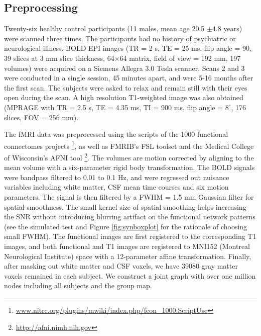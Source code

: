 \documentclass[review,authoryear]{elsarticle}
\begin{document}
\subsection{Preprocessing}
Twenty-six healthy control participants (11 males, mean age 20.5 $\pm 4.8$
years) were scanned three times. The participants had no history
of psychiatric or neurological illness. BOLD EPI images (TR = 2 s, TE = 25 ms,
flip angle = 90, 39 slices at 3 mm slice thickness, 64$\times$64 matrix, field
of view = 192 mm, 197 volumes) were acquired on a Siemens Allegra 3.0 Tesla
scanner. Scans 2 and 3 were conducted in a single session, 45
minutes apart, and were 5-16 months after the first scan. The subjects were
asked to relax and remain still with their eyes open during the scan. A high
resolution T1-weighted image was also obtained (MPRAGE with TR = 2.5 s, TE =
4.35 ms, TI = 900 ms, flip angle = $8^\circ$, 176 slices, FOV = 256 mm).

The fMRI data was preprocessed using the scripts of the 1000 functional
connectomes
projects \footnote{\url{www.nitrc.org/plugins/mwiki/index.php/fcon_1000:ScriptUse}},
as well as FMRIB's FSL toolset and the Medical College of Wisconsin's AFNI
tool \footnote{\url{http://afni.nimh.nih.gov}}. The volumes are motion corrected
by aligning to the mean volume with a six-parameter rigid body
transformation. The BOLD signals were bandpass filtered to 0.01 to 0.1 Hz, and
were regressed out nuisance variables including white matter, CSF mean time
courses and six motion parameters. The signal is then filtered by a FWHM = 1.5
mm Gaussian filter for spatial smoothness. The small kernel size of spatial
smoothing helps increasing the SNR without introducing
blurring artifact on the functional network patterns (see the simulated test and
Figure \ref{fig:synboxplot} for the rationale of choosing small FWHM). The
functional images are first registered to the corresponding T1 images, and both
functional and T1 images are registered to MNI152 (Montreal Neurological
Institute) space with a 12-parameter affine transformation. Finally, after
masking out white matter and CSF voxels, we have 39080 gray matter voxels
remained in each subject. We construct a joint graph with over one million nodes
including all subjects and the group map.
\end{document}
